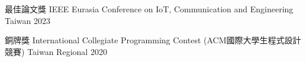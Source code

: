 

\begin{cvhonors}

  \cvhonor
    {最佳論文獎} %
    {IEEE Eurasia Conference on IoT, Communication and Engineering} %
    {Taiwan} %
    {2023} %

  \cvhonor
    {銅牌獎} %
    {International Collegiate Programming Contest (ACM國際大學生程式設計競賽)} %
    {Taiwan Regional} %
    {2020} %

\end{cvhonors}
